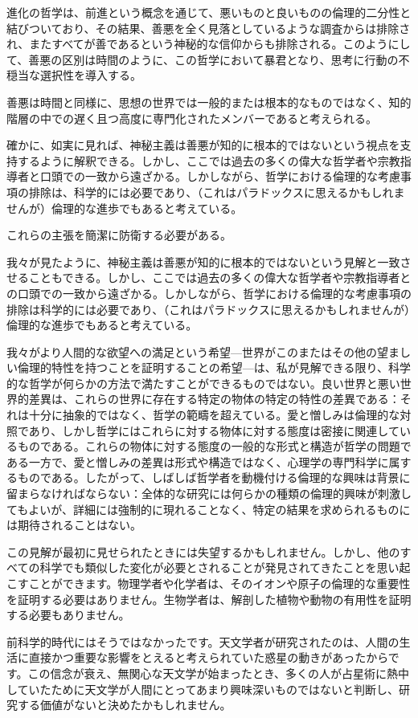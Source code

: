\documentclass[a4paper,11pt,openany]{ltjsbook}
\begin{document}
進化の哲学は、前進という概念を通じて、悪いものと良いものの倫理的二分性と結びついており、その結果、善悪を全く見落としているような調査からは排除され、またすべてが善であるという神秘的な信仰からも排除される。このようにして、善悪の区別は時間のように、この哲学において暴君となり、思考に行動の不穏当な選択性を導入する。

善悪は時間と同様に、思想の世界では一般的または根本的なものではなく、知的階層の中での遅く且つ高度に専門化されたメンバーであると考えられる。

確かに、如実に見れば、神秘主義は善悪が知的に根本的ではないという視点を支持するように解釈できる。しかし、ここでは過去の多くの偉大な哲学者や宗教指導者と口頭での一致から遠ざかる。しかしながら、哲学における倫理的な考慮事項の排除は、科学的には必要であり、（これはパラドックスに思えるかもしれませんが）倫理的な進歩でもあると考えている。

これらの主張を簡潔に防衛する必要がある。

我々が見たように、神秘主義は善悪が知的に根本的ではないという見解と一致させることもできる。しかし、ここでは過去の多くの偉大な哲学者や宗教指導者との口頭での一致から遠ざかる。しかしながら、哲学における倫理的な考慮事項の排除は科学的には必要であり、（これはパラドックスに思えるかもしれませんが）倫理的な進歩でもあると考えている。


我々がより人間的な欲望への満足という希望—世界がこのまたはその他の望ましい倫理的特性を持つことを証明することの希望—は、私が見解できる限り、科学的な哲学が何らかの方法で満たすことができるものではない。良い世界と悪い世界的差異は、これらの世界に存在する特定の物体の特定の特性の差異である：それは十分に抽象的ではなく、哲学の範疇を超えている。愛と憎しみは倫理的な対照であり、しかし哲学にはこれらに対する物体に対する態度は密接に関連しているものである。これらの物体に対する態度の一般的な形式と構造が哲学の問題である一方で、愛と憎しみの差異は形式や構造ではなく、心理学の専門科学に属するものである。したがって、しばしば哲学者を動機付ける倫理的な興味は背景に留まらなければならない：全体的な研究には何らかの種類の倫理的興味が刺激してもよいが、詳細には強制的に現れることなく、特定の結果を求められるものには期待されることはない。

この見解が最初に見せられたときには失望するかもしれません。しかし、他のすべての科学でも類似した変化が必要とされることが発見されてきたことを思い起こすことができます。物理学者や化学者は、そのイオンや原子の倫理的な重要性を証明する必要はありません。生物学者は、解剖した植物や動物の有用性を証明する必要もありません。

前科学的時代にはそうではなかったです。天文学者が研究されたのは、人間の生活に直接かつ重要な影響をとえると考えられていた惑星の動きがあったからです。この信念が衰え、無関心な天文学が始まったとき、多くの人が占星術に熱中していたために天文学が人間にとってあまり興味深いものではないと判断し、研究する価値がないと決めたかもしれません。
\end{document}
